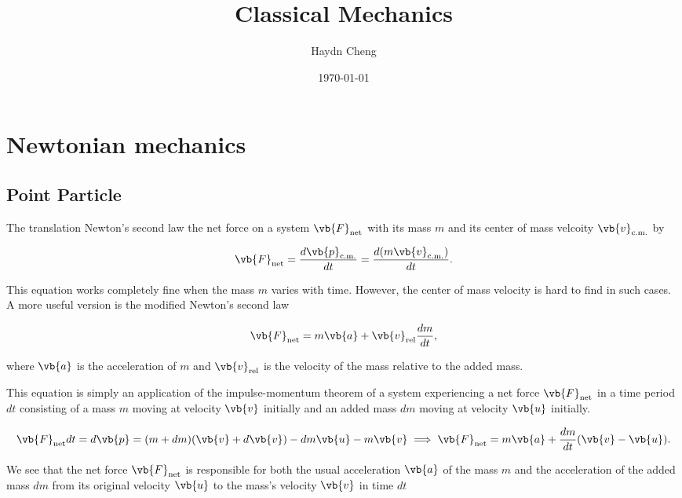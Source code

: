 \documentclass[a4paper,12pt]{report}
\title{Classical Mechanics}
\author{Haydn Cheng}
\date{\today}
\begin{document}
\maketitle
\tableofcontents
	
\chapter{Newtonian mechanics}
\section{Point Particle}

The translation Newton's second law the net force on a system \(\vb{F} _{\text{net} } \) with its mass \(m\) and its center of mass velcoity \(\vb{v} _{\text{c.m.} } \) by  

\begin{equation}
	\vb{F}_{\text{net} }  = \frac{d\vb{p}_{\text{c.m.} }  }{dt}  = \frac{d (m\vb{v}_{\text{c.m.} } ) }{d t} . \label{new2} 
\end{equation}

This equation works completely fine when the mass \(m\) varies with time. However, the center of mass velocity is hard to find in such cases. A more useful version is the modified Newton's second law

\begin{equation}
	\vb{F}_{\text{net} }  = m\vb{a} + \vb{v} _{\text{rel} } \frac{dm}{dt},  \label{new2prime} 
\end{equation}

where \(\vb{a} \) is the acceleration of \(m\) and  \(\vb{v} _{\text{rel} } \) is the velocity of the mass relative to the added mass.

This equation is simply an application of the impulse-momentum theorem of a system experiencing a net force \(\vb{F} _{\text{net} } \)  in a time period \(dt\) consisting of a mass \(m\) moving at velocity \(\vb{v} \) initially and an added mass \(dm\) moving at velocity \(\vb{u} \) initially.

\begin{equation}
	\vb{F}_{\text{net} }  dt = d\vb{p}  = (m+dm)(\vb{v} +d\vb{v} )-dm \vb{u} -m\vb{v}  \implies \vb{F} _{\text{net} }  = m\vb{a} +\frac{dm}{dt}(\vb{v} -\vb{u} ).  
\end{equation}

We see that the net force \(\vb{F}_{\text{net} }  \) is responsible for both the usual acceleration \(\vb{a} \) of the mass \(m\) and the acceleration of the added mass \(dm\) from its original velocity \(\vb{u} \) to the mass's velocity \(\vb{v} \) in time \(dt\)   
\end{document}
